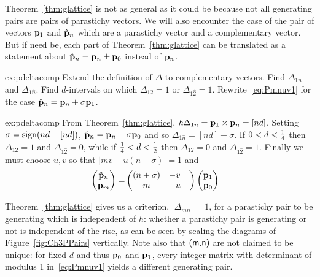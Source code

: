 Theorem~\ref{thm:glattice} is not as general as it could be because not all generating pairs are pairs of parastichy vectors. We will also encounter the case of the pair of vectors 
${\mathbf p}_{1}$ and $\hat{\mathbf p}_{n}$ which are a parastichy vector and a complementary vector. But if need be, each part of Theorem~\ref{thm:glattice} can be translated as a statement about $\hat{\mathbf p}_{n}={\mathbf p}_{n}\pm{\mathbf p}_{0}$ instead of ${\mathbf p}_{n}$. 

\begin{jExercise}{ex:pdeltacomp}
Extend the definition of $\Delta$ to complementary vectors. 	Find   $\Delta_{1n}$ and $\Delta_{1\hat n}$. Find  $d$-intervals on which 
$\Delta_{12}=1$ or $\Delta_{1\hat 2}=1$. Rewrite~\eqref{eq:Pmnuv1} for the case $\hat{\mathbf p}_{n}={\mathbf p}_{n}+\sigma{\mathbf p}_{1}$.
\label{ex:calcdelta}
\end{jExercise}
\begin{jAnswer}{ex:pdeltacomp}
From Theorem~\ref{thm:glattice}, $h\Delta_{1n}={\mathbf p}_{1}\times{\mathbf p}_{n}=[nd]$.
Setting $\sigma=\mathrm{sign} (nd -[nd])$, $\hat{\mathbf p}_{n}={\mathbf p}_{n}-\sigma{\mathbf p}_{0}$ and so $\Delta_{1\hat n}=[nd]+\sigma$. 
If $0<d<\textstyle{\frac{1}{4}}$ then $\Delta_{12}=1$ and $\Delta_{1\hat2}=0$, while 
if  $\textstyle{\frac{1}{4}}<d<\textstyle{\frac{1}{2}}$ then  $\Delta_{12}=0$ and $\Delta_{1\hat2}=1$.
Finally we must choose $u,v$ so that $|mv -u(n+\sigma)|=1$ and
		\begin{align}\label{eq:Pmnuv1ex}
		\begin{pmatrix}
			\hat{\mathbf p}_{n} \\ {\mathbf p}_{m} 
		\end{pmatrix} = &
		\begin{pmatrix}
			(n+\sigma)  & - v 
			\\
			m &- u &
		\end{pmatrix}
		\begin{pmatrix}
			{\mathbf p}_{1}
			\\
			{\mathbf p}_{0}
		\end{pmatrix}
	\end{align}
\end{jAnswer}

Theorem~\ref{thm:glattice} gives us a criterion, $|\Delta_{mn}|=1$, for a parastichy pair to be generating which is independent of $h$: whether a parastichy pair is generating or not is independent of the rise, as can be seen by scaling the diagrams of Figure~\ref{fig:Ch3PPairs} vertically.  Note also that $\textsf{(m,n)}$ are not claimed to be unique: for fixed $d$ and thus ${\mathbf p}_{0}$ and ${\mathbf p}_{1}$, every integer matrix with determinant of modulus 1 in~\eqref{eq:Pmnuv1} yields a different generating pair.


